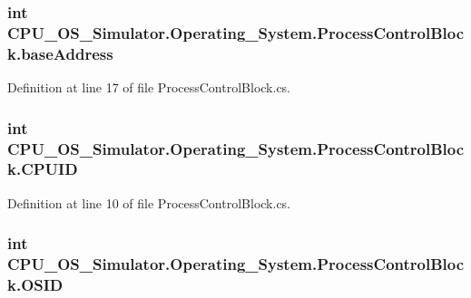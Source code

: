 \subsubsection[{base\+Address}]{\setlength{\rightskip}{0pt plus 5cm}int C\+P\+U\+\_\+\+O\+S\+\_\+\+Simulator.\+Operating\+\_\+\+System.\+Process\+Control\+Block.\+base\+Address\hspace{0.3cm}{\ttfamily [private]}}\label{class_c_p_u___o_s___simulator_1_1_operating___system_1_1_process_control_block_aa539c0c08de4523f8d6e9b21fe4165e6}


Definition at line 17 of file Process\+Control\+Block.\+cs.

\hypertarget{class_c_p_u___o_s___simulator_1_1_operating___system_1_1_process_control_block_abb9341cb0d47b6acb52a4f219d69b600}{}
\subsubsection[{C\+P\+U\+I\+D}]{\setlength{\rightskip}{0pt plus 5cm}int C\+P\+U\+\_\+\+O\+S\+\_\+\+Simulator.\+Operating\+\_\+\+System.\+Process\+Control\+Block.\+C\+P\+U\+I\+D\hspace{0.3cm}{\ttfamily [private]}}\label{class_c_p_u___o_s___simulator_1_1_operating___system_1_1_process_control_block_abb9341cb0d47b6acb52a4f219d69b600}


Definition at line 10 of file Process\+Control\+Block.\+cs.

\hypertarget{class_c_p_u___o_s___simulator_1_1_operating___system_1_1_process_control_block_a417b892bfe8ec7f9d5a64eb413b2a333}{}
\subsubsection[{O\+S\+I\+D}]{\setlength{\rightskip}{0pt plus 5cm}int C\+P\+U\+\_\+\+O\+S\+\_\+\+Simulator.\+Operating\+\_\+\+System.\+Process\+Control\+Block.\+O\+S\+I\+D\hspace{0.3cm}{\ttfamily [private]}}\label{class_c_p_u___o_s___simulator_1_1_operating___system_1_1_process_control_block_a417b892bfe8ec7f9d5a64eb413b2a333}


